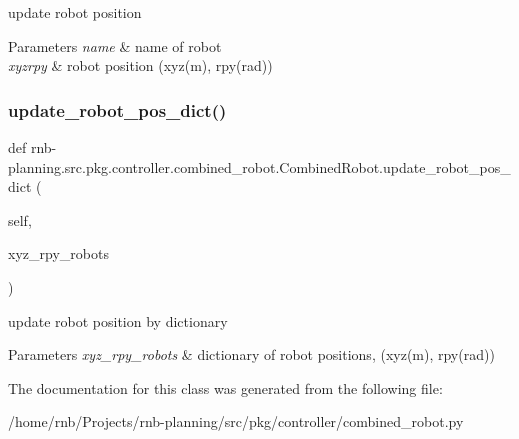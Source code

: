 update robot position 


\begin{DoxyParams}{Parameters}
{\em name} & name of robot \\
\hline
{\em xyzrpy} & robot position (xyz(m), rpy(rad)) \\
\hline
\end{DoxyParams}
\mbox{\label{classrnb-planning_1_1src_1_1pkg_1_1controller_1_1combined__robot_1_1_combined_robot_a9a9b8c7c2ee78d719658e4fe4e11521c}} 
\subsubsection{\texorpdfstring{update\+\_\+robot\+\_\+pos\+\_\+dict()}{update\_robot\_pos\_dict()}}
{\footnotesize\ttfamily def rnb-\/planning.\+src.\+pkg.\+controller.\+combined\+\_\+robot.\+Combined\+Robot.\+update\+\_\+robot\+\_\+pos\+\_\+dict (\begin{DoxyParamCaption}\item[{}]{self,  }\item[{}]{xyz\+\_\+rpy\+\_\+robots }\end{DoxyParamCaption})}



update robot position by dictionary 


\begin{DoxyParams}{Parameters}
{\em xyz\+\_\+rpy\+\_\+robots} & dictionary of robot positions, (xyz(m), rpy(rad)) \\
\hline
\end{DoxyParams}


The documentation for this class was generated from the following file\+:\begin{DoxyCompactItemize}
\item 
/home/rnb/\+Projects/rnb-\/planning/src/pkg/controller/combined\+\_\+robot.\+py\end{DoxyCompactItemize}
